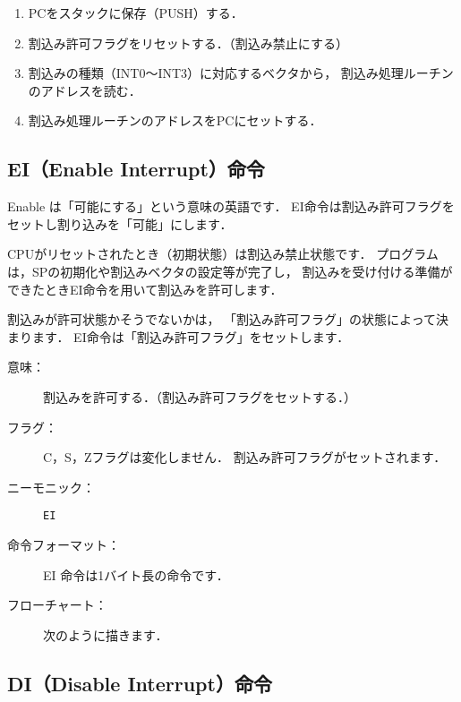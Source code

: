 \begin{enumerate}
\item PCをスタックに保存（PUSH）する．
\item 割込み許可フラグをリセットする．（割込み禁止にする）
\item 割込みの種類（INT0〜INT3）に対応するベクタから，
割込み処理ルーチンのアドレスを読む．
\item 割込み処理ルーチンのアドレスをPCにセットする．
\end{enumerate}

\subsection{EI（Enable Interrupt）命令}
Enable は「可能にする」という意味の英語です．
EI命令は割込み許可フラグをセットし割り込みを「可能」にします．

CPUがリセットされたとき（初期状態）は割込み禁止状態です．
プログラムは，SPの初期化や割込みベクタの設定等が完了し，
割込みを受け付ける準備ができたときEI命令を用いて割込みを許可します．

割込みが許可状態かそうでないかは，
「割込み許可フラグ」の状態によって決まります．
EI命令は「割込み許可フラグ」をセットします．

\begin{description}
\item[意味：]割込みを許可する．（割込み許可フラグをセットする．）

\item[フラグ：]C，S，Zフラグは変化しません．
割込み許可フラグがセットされます．

\item[ニーモニック：] {\tt EI}

\item[命令フォーマット：]EI 命令は1バイト長の命令です．


\item[フローチャート：]
次のように描きます．

\begin{center}
\end{center}

\end{description}

\subsection{DI（Disable Interrupt）命令}

